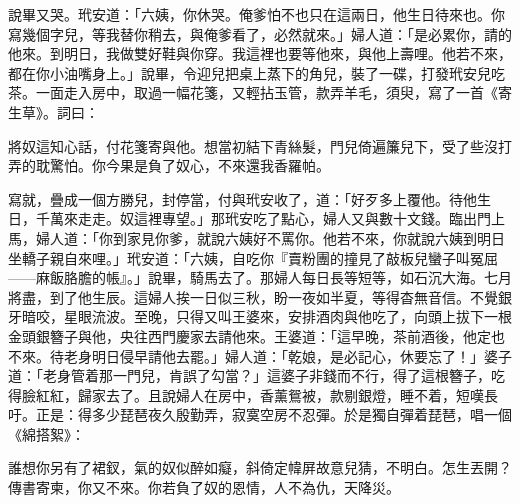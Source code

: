 說畢又哭。玳安道：「六姨，你休哭。俺爹怕不也只在這兩日，他生日待來也。你寫幾個字兒，等我替你稍去，與俺爹看了，必然就來。」婦人道：「是必累你，請的他來。到明日，我做雙好鞋與你穿。我這裡也要等他來，與他上壽哩。他若不來，都在你小油嘴身上。」說畢，令迎兒把桌上蒸下的角兒，裝了一碟，打發玳安兒吃茶。一面走入房中，取過一幅花箋，又輕拈玉管，款弄羊毛，須臾，寫了一首《寄生草》。詞曰：

\begin{myquote} 
將奴這知心話，付花箋寄與他。想當初結下青絲髮，門兒倚遍簾兒下，受了些沒打弄的耽驚怕。你今果是負了奴心，不來還我香羅帕。
\end{myquote} 

寫就，疊成一個方勝兒，封停當，付與玳安收了，道：「好歹多上覆他。待他生日，千萬來走走。奴這裡專望。」那玳安吃了點心，婦人又與數十文錢。臨出門上馬，婦人道：「你到家見你爹，就說六姨好不罵你。{}他若不來，你就說六姨到明日坐轎子親自來哩。」玳安道：「六姨，自吃你『賣粉團的撞見了敲板兒蠻子叫冤屈——麻飯胳膽的帳』。」{}說畢，騎馬去了。那婦人每日長等短等，如石沉大海。七月將盡，到了他生辰。這婦人挨一日似三秋，盼一夜如半夏，等得杳無音信。不覺銀牙暗咬，星眼流波。至晚，只得又叫王婆來，安排酒肉與他吃了，向頭上拔下一根金頭銀簪子與他，央往西門慶家去請他來。王婆道：「這早晚，茶前酒後，他定也不來。待老身明日侵早請他去罷。」婦人道：「乾娘，是必記心，休要忘了！」婆子道：「老身管着那一門兒，{}肯誤了勾當？」這婆子非錢而不行，得了這根簪子，吃得臉紅紅，歸家去了。且說婦人在房中，香薰鴛被，款剔銀燈，睡不着，短嘆長吁。正是：得多少琵琶夜久殷勤弄，寂寞空房不忍彈。於是獨自彈着琵琶，唱一個《綿搭絮》：

\begin{myquote} 
誰想你另有了裙釵，氣的奴似醉如癡，斜倚定幃屏故意兒猜，不明白。怎生丟開？傳書寄柬，你又不來。你若負了奴的恩情，人不為仇，天降災。
\end{myquote} 

